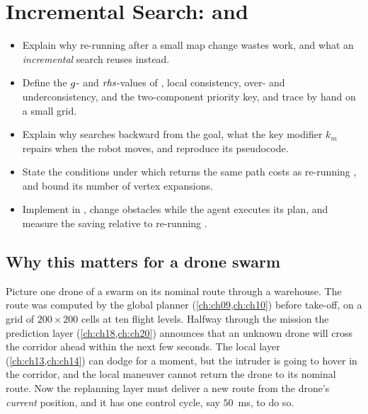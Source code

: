 \chapter{Incremental Search: \lpastar and \dstarlite}
\label{ch:ch05}

\begin{objectives}
\begin{itemize}
  \item Explain why re-running \astar after a small map change wastes work, and what an
    \emph{incremental} search reuses instead.
  \item Define the $g$- and $\mathit{rhs}$-values of \lpastar, local consistency, over- and
    underconsistency, and the two-component priority key, and trace \lpastar by hand on a
    small grid.
  \item Explain why \dstarlite searches backward from the goal, what the key modifier
    $k_m$ repairs when the robot moves, and reproduce its pseudocode.
  \item State the conditions under which \dstarlite returns the same path costs as
    re-running \astar, and bound its number of vertex expansions.
  \item Implement \dstarlite in \python, change obstacles while the agent executes its
    plan, and measure the saving relative to re-running \astar.
\end{itemize}
\end{objectives}

\section{Why this matters for a drone swarm}
\label{sec:ch05-motivation}

Picture one drone of a swarm on its nominal route through a warehouse. The route was
computed by the global planner (\cref{ch:ch09,ch:ch10}) before take-off, on a grid of
$200 \times 200$ cells at ten flight levels. Halfway through the mission the prediction
layer (\cref{ch:ch18,ch:ch20}) announces that an unknown drone will cross the corridor
ahead within the next few seconds. The local layer (\cref{ch:ch13,ch:ch14}) can dodge for
a moment, but the intruder is going to hover in the corridor, and the local maneuver
cannot return the drone to its nominal route. Now the replanning layer must deliver a new
route from the drone's \emph{current} position, and it has one control cycle,
say $50$~ms, to do so.

